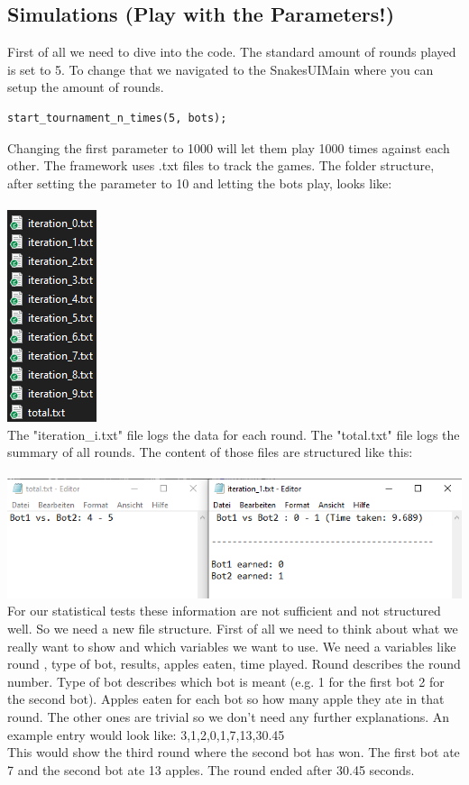 \documentclass[a4paper,12pt]{article}
\begin{document}
\subsection{Simulations (Play with the Parameters!)}
First of all we need to dive into the code. The standard amount of rounds played is set to 5. To change that we navigated to the SnakesUIMain where you can setup the amount of rounds.
\begin{verbatim}
start_tournament_n_times(5, bots);
\end{verbatim}
Changing the first parameter to 1000 will let them play 1000 times against each other. The framework uses .txt files to track the games. The folder structure, after setting the parameter to 10 and letting the bots play, looks like:\\
\\
\includegraphics[scale=0.8]{logs_structure}
\\The "iteration\_i.txt" file logs the data for each round. The "total.txt" file logs the summary of all rounds. The content of those files are structured like this:\\
\\
\includegraphics[scale=0.8]{logs_content}
\\For our statistical tests these information are not sufficient and not structured well. So we need a new file structure. First of all we need to think about what we really want to show and which variables we want to use. We need a variables like round , type of bot, results, apples eaten, time played. Round describes the round number. Type of bot describes which bot is meant (e.g. 1 for the first bot 2 for the second bot). Apples eaten for each bot so how many apple they ate in that round. The other ones are trivial so we don't need any further explanations. An example entry would look like: 3,1,2,0,1,7,13,30.45
\\ This would show the third round where the second bot has won. The first bot ate 7 and the second bot ate 13 apples. The round ended after 30.45 seconds.
\end{document}
